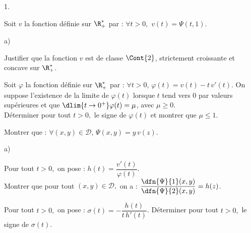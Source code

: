 \begin{noliste}{1.}
 \setlength{\itemsep}{4mm}
 \setcounter{enumi}{4}
 \item Soit $v$ la fonction définie sur $\R_+^*$ par : $\forall t > 0,$ 
 $v(t)=\Psi(t,1).$
 \begin{noliste}{a)}
  \setlength{\itemsep}{2mm}
  \item Justifier que la fonction $v$ est de classe $\Cont{2}$, 
  strictement croissante et concave sur $\R_+^*$.
  
  

  
  
  
  
  
  
  
  \item Soit $\varphi$ la fonction définie sur $\R_+^*$ par : $\forall 
  t >0$, $\varphi(t)=v(t)-t \, v'(t)$. On suppose l'existence de la 
  limite de $\varphi(t)$ lorsque $t$ tend vers 0 par valeurs supérieures
  et que $\dlim{t \to 0^+} \varphi(t)=\mu$, avec $\mu \geq 0$.\\
  Déterminer pour tout $t>0,$ le signe de $\varphi(t)$ et montrer que 
  $\mu \leq 1$.
  
  

  
  \item Montrer que : $\forall (x,y) \in \mathcal{D}$, 
  $\Psi(x,y)=y \, v(z)$.
  
  
 \end{noliste}
 
 
 
 
 
 
 
 
 
 \item\label{6} 
 \begin{noliste}{a)}
  \setlength{\itemsep}{2mm}
  \item Pour tout $t>0,$ on pose : $h(t)=\dfrac{v'(t)}{\varphi(t)}$.\\
  Montrer que pour tout $(x,y) \in \mathcal{D},$ on a : 
  $\dfrac{\dfn{\Psi}{1}(x,y)}{\dfn{\Psi}{2}(x,y)}=h(z)$.
  
  

  
  \item Pour tout $t>0,$ on pose : $\sigma(t)=-\dfrac{h(t)}{t \, 
  h'(t)}$. Déterminer pour tout $t>0,$ le signe de $\sigma(t)$.
  
  
 \end{noliste}
 
 
 
 
 \newpage
 

\end{noliste}
